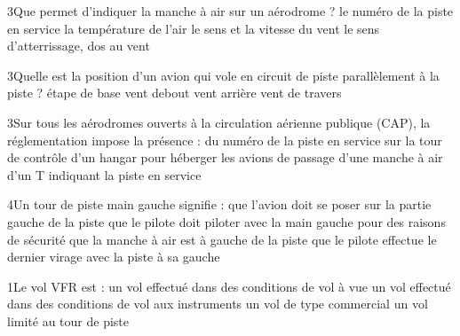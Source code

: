 {3}{Que permet d'indiquer la manche à air sur un aérodrome ?}
{le numéro de la piste en service}
{la température de l'air}
{le sens et la vitesse du vent}
{le sens d'atterrissage, dos au vent} 
{}

{3}{Quelle est la position d'un avion qui vole en circuit de piste parallèlement à la piste ?}
{étape de base}
{vent debout}
{vent arrière}
{vent de travers} 
{}

{3}{Sur tous les aérodromes ouverts à la circulation aérienne publique (CAP), la réglementation impose la présence : }
{du numéro de la piste en service sur la tour de contrôle}
{d'un hangar pour héberger les avions de passage}
{d'une manche à air}
{d'un T indiquant la piste en service} 
{}

{4}{Un tour de piste main gauche signifie : }
{que l'avion doit se poser sur la partie gauche de la piste}
{que le pilote doit piloter avec la main gauche pour des raisons de sécurité}
{que la manche à air est à gauche de la piste} 
{que le pilote effectue le dernier virage avec la piste à sa gauche}
{}

{1}{Le vol VFR est : }
{un vol effectué dans des conditions de vol à vue}
{un vol effectué dans des conditions de vol aux instruments}
{un vol de type commercial} 
{un vol limité au tour de piste}
{}
 
 
 

